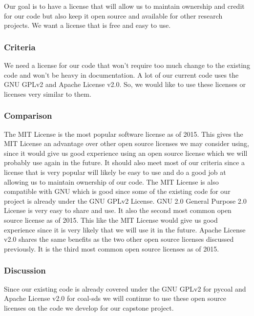 \documentclass[10pt,draftclsnofoot,onecolumn,journal,compsoc]{IEEEtran}
\begin{document}
\noindent Our goal is to have a license that will allow us to maintain ownership and credit for our code but also keep it open source and available for other research projects. We want a license that is free and easy to use.

\subsubsection{Criteria}

\noindent We need a license for our code that won't require too much change to the existing code and won't be heavy in documentation. A lot of our current code uses the GNU GPLv2 and Apache License v2.0. So, we would like to use these licenses or licenses very similar to them.

\subsubsection{Comparison}

\noindent The MIT License is the most popular software license as of 2015\cite{19}. This gives the MIT License an advantage over other open source licenses we may consider using, since it would give us good experience using an open source license which we will probably use again in the future. It should also meet most of our criteria since a license that is very popular will likely be easy to use and do a good job at allowing us to maintain ownership of our code. The MIT License is also compatible with GNU which is good since some of the existing code for our project is already under the GNU GPLv2 License.
\newline
\noindent GNU 2.0 General Purpose 2.0 License is very easy to share and use. It also the second most common open source license as of 2015\cite{19}. This like the MIT License would give us good experience since it is very likely that we will use it in the future.
\newline
\noindent Apache License v2.0 shares the same benefits as the two other open source licenses discussed previously. It is the third most common open source licenses as of 2015\cite{19}.

\subsubsection{Discussion}

\noindent Since our existing code is already covered under the GNU GPLv2 for pycoal and Apache License v2.0 for coal-sds we will continue to use these open source licenses on the code we develop for our capstone project.
\end{document}
